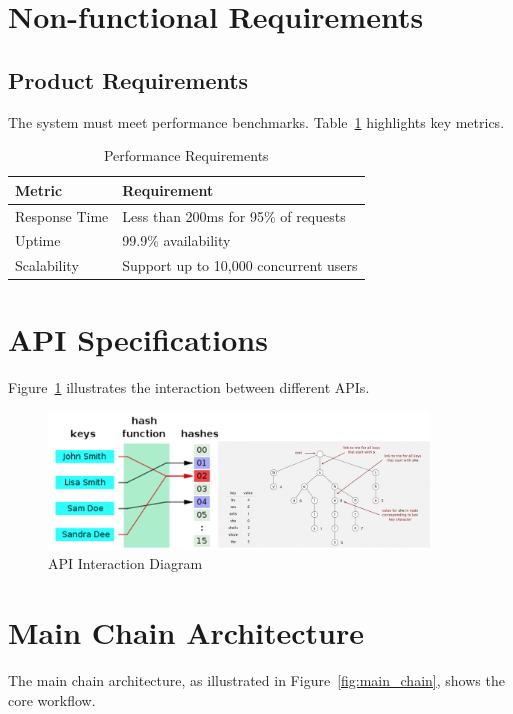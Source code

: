 \section{Non-functional Requirements}

\subsection{Product Requirements}
The system must meet performance benchmarks. Table~\ref{tab:performance_requirements} highlights key metrics.

\begin{table}[h]
    \centering
    \begin{tabular}{|l|l|}
        \hline
        \textbf{Metric} & \textbf{Requirement} \\ \hline
        Response Time & Less than 200ms for 95\% of requests \\ \hline
        Uptime & 99.9\% availability \\ \hline
        Scalability & Support up to 10,000 concurrent users \\ \hline
    \end{tabular}
    \caption{Performance Requirements}
    \label{tab:performance_requirements}
\end{table}

\section{API Specifications}
Figure~\ref{fig:api_interaction} illustrates the interaction between different APIs.

\begin{figure}[h]
    \centering
    \includegraphics[width=0.9\textwidth]{images/hashing.png}
    \caption{API Interaction Diagram}
    \label{fig:api_interaction}
\end{figure}

\section{Main Chain Architecture}
The main chain architecture, as illustrated in Figure~\ref{fig:main_chain}, shows the core workflow.

